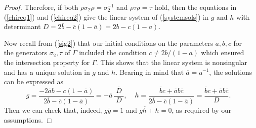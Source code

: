 \documentclass[10pt,a4paper]{amsart}
\begin{document}
\begin{proof}
Therefore, if both $\rho \sigma_2\rho = \sigma_2^{-1}$ and $\rho\tau\rho=\tau$ hold, then the equations in (\ref{chireq1}) and (\ref{chireq2}) give the linear system of (\ref{systemsols}) in $g$ and $h$ with determinant $D=2\overline{b}-\overline{c}(1-\overline{a}) = \overline{2b-c(1-a)}$. 

Now recall from (\ref{sig2}) that our initial conditions on the parameters $a,b,c$ for the generators $\sigma_2,\tau$ of $\Gamma$ included the condition $c\neq 2b/(1-a)$ which ensured the intersection property for $\Gamma$. This shows that the linear system is nonsingular and has a unique solution in $g$ and $h$. Bearing in mind that $\overline{a}=a^{-1}$, the solutions can be expressed as 
\[ g=\frac{-2\overline{a}b-c(1-\overline{a})}{2\overline{b}-\overline{c}(1-\overline{a})}=
-\overline{a}\,\frac{\;\overline{D}\;}{\,D\,},
\;\;\;\; h=\frac{\overline{b}c+\overline{a}b\overline{c}}{2\overline{b}-\overline{c}(1-\overline{a})}=\frac{\overline{b}c+\overline{a}b\overline{c}}{D}.\]
Then we can check that, indeed, $g\overline{g}=1$ and $g\overline{h}+h=0$, as required by our assumptions. 
\end{proof}
\end{document}
